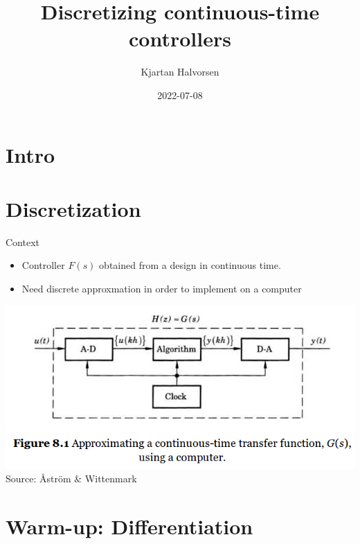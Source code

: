 \documentclass[presentation,aspectratio=1610]{beamer}
\author{Kjartan Halvorsen}
\date{2022-07-08}
\title{Discretizing continuous-time controllers}
\begin{document}
\maketitle


\section{Intro}
\label{sec:org3cfdf55}

\section{Discretization}
\label{sec:org4173e32}
\begin{frame}[label={sec:orge7a4022}]{Context}
\begin{itemize}
\item Controller \(F(s)\) obtained from a design in continuous time.
\item Need discrete approxmation in order to implement on a computer
\end{itemize}

\begin{center}
 \includegraphics[width=0.7\linewidth]{../../figures/fig8-1.png}\\
 \footnotesize Source: Åström \& Wittenmark 
\end{center}
\end{frame}

\section{Warm-up: Differentiation}
\label{sec:org78c256d}
\end{document}
